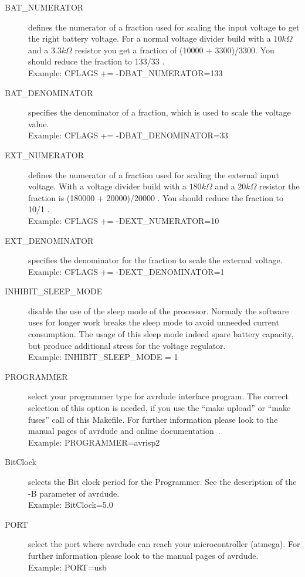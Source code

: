 \begin{description}
 \item[BAT\_NUMERATOR] defines the numerator of a fraction used for scaling the input voltage to get the right
battery voltage.
For a normal voltage divider build with a \(10 k\Omega\) and a \(3.3 k\Omega\) resistor you get a fraction 
of (10000 + 3300)/3300. 
You should reduce the fraction to 133/33 .\\
Example: CFLAGS += -DBAT\_NUMERATOR=133

 \item[BAT\_DENOMINATOR] specifies the denominator of a fraction, which is used to scale the voltage value.\\
Example: CFLAGS += -DBAT\_DENOMINATOR=33

 \item[EXT\_NUMERATOR] defines the numerator of a fraction used for scaling the external input voltage.
 With a voltage divider build with a \(180 k\Omega\) and a \(20 k\Omega\) resistor the fraction is (180000 + 20000)/20000 .
You should reduce the fraction to 10/1 .\\
Example: CFLAGS += -DEXT\_NUMERATOR=10

 \item[EXT\_DENOMINATOR] specifies the denominator for the fraction to scale the external voltage. \\
Example: CFLAGS += -DEXT\_DENOMINATOR=1

  \item[INHIBIT\_SLEEP\_MODE] disable the use of the sleep mode of the processor.
Normaly the software uses for longer work breaks the sleep mode to avoid unneeded current consumption.
The usage of this sleep mode indeed spare battery capacity, but produce additional stress for the voltage regulator.\\
Example: INHIBIT\_SLEEP\_MODE = 1

  \item[PROGRAMMER] select your programmer type for avrdude interface program.
The correct selection of this option is needed, if you use the ``make upload'' or ``make fuses'' call
of this Makefile.
For further information please look to the manual pages of avrdude and online documentation~\cite{avrdude}.\\
Example: PROGRAMMER=avrisp2

  \item[BitClock] selects the Bit clock period for the Programmer. See the description of the -B parameter of avrdude.\\
Example: BitClock=5.0

  \item[PORT] select the port where avrdude can reach your microcontroller (atmega).
For further information please look to the manual pages of avrdude.\\
Example: PORT=usb

\end{description}

